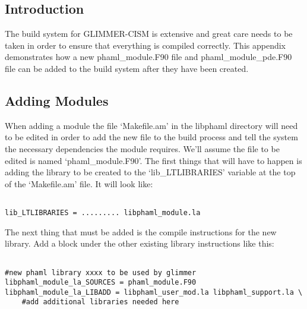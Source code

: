 \subsection{Introduction}\label{sec:addintro}

The build system for GLIMMER-CISM is extensive and great care needs to be taken in order to ensure that everything is compiled correctly.  This appendix demonstrates how a new phaml\_module.F90 file and phaml\_module\_pde.F90 file can be added to the build system after they have been created.

\subsection{Adding Modules}\label{sec:addmod}

When adding a module the file `Makefile.am' in the libphaml directory will need to be edited in order to add the new file to the build process and tell the system the necessary dependencies the module requires.  We'll assume the file to be edited is named `phaml\_module.F90'.  The first things that will have to happen is adding the library to be created to the `lib\_LTLIBRARIES' variable at the top of the `Makefile.am' file.  It will look like:

\begin{framecode}{6in}
\begin{verbatim}

lib_LTLIBRARIES = ......... libphaml_module.la

\end{verbatim}
\end{framecode}

The next thing that must be added is the compile instructions for the new library.  Add a block under the other existing library instructions like this:

\begin{framecode}{6in}
\begin{verbatim}

#new phaml library xxxx to be used by glimmer
libphaml_module_la_SOURCES = phaml_module.F90 
libphaml_module_la_LIBADD = libphaml_user_mod.la libphaml_support.la \
    #add additional libraries needed here

\end{verbatim}
\end{framecode}

